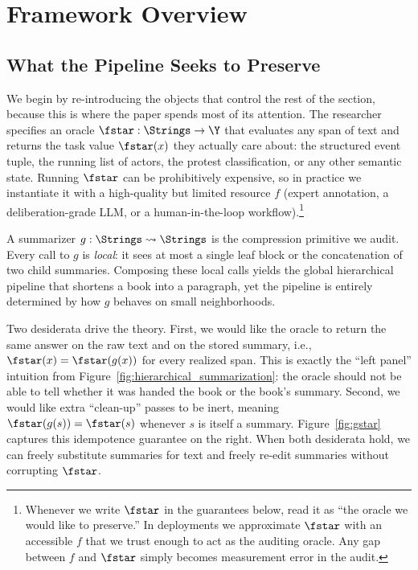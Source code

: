 \section{Framework Overview}\label{sec:overview}

\subsection{What the Pipeline Seeks to Preserve}

We begin by re-introducing the objects that control the rest of the section, because this is where the paper spends most of its attention. The researcher specifies an oracle $\fstar: \Strings \to \Y$ that evaluates any span of text and returns the task value $\fstar(x)$ they actually care about: the structured event tuple, the running list of actors, the protest classification, or any other semantic state. Running $\fstar$ can be prohibitively expensive, so in practice we instantiate it with a high-quality but limited resource $f$ (expert annotation, a deliberation-grade LLM, or a human-in-the-loop workflow).\footnote{Whenever we write $\fstar$ in the guarantees below, read it as ``the oracle we would like to preserve.'' In deployments we approximate $\fstar$ with an accessible $f$ that we trust enough to act as the auditing oracle. Any gap between $f$ and $\fstar$ simply becomes measurement error in the audit.}

A summarizer $g: \Strings \rightsquigarrow \Strings$ is the compression primitive we audit. Every call to $g$ is \emph{local}: it sees at most a single leaf block or the concatenation of two child summaries. Composing these local calls yields the global hierarchical pipeline that shortens a book into a paragraph, yet the pipeline is entirely determined by how $g$ behaves on small neighborhoods.

Two desiderata drive the theory. First, we would like the oracle to return the same answer on the raw text and on the stored summary, i.e., $\fstar(x) = \fstar(g(x))$ for every realized span. This is exactly the ``left panel'' intuition from Figure~\ref{fig:hierarchical_summarization}: the oracle should not be able to tell whether it was handed the book or the book's summary. Second, we would like extra ``clean-up'' passes to be inert, meaning $\fstar(g(s)) = \fstar(s)$ whenever $s$ is itself a summary. Figure~\ref{fig:gstar} captures this idempotence guarantee on the right. When both desiderata hold, we can freely substitute summaries for text and freely re-edit summaries without corrupting $\fstar$.

